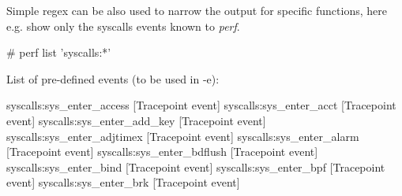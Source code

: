 Simple regex can be also used to narrow the output for specific
functions, here e.g. show only the syscalls events known to {\em perf}.

\starttyping
# perf list 'syscalls:*'

List of pre-defined events (to be used in -e):

  syscalls:sys_enter_access                          [Tracepoint event]
  syscalls:sys_enter_acct                            [Tracepoint event]
  syscalls:sys_enter_add_key                         [Tracepoint event]
  syscalls:sys_enter_adjtimex                        [Tracepoint event]
  syscalls:sys_enter_alarm                           [Tracepoint event]
  syscalls:sys_enter_bdflush                         [Tracepoint event]
  syscalls:sys_enter_bind                            [Tracepoint event]
  syscalls:sys_enter_bpf                             [Tracepoint event]
  syscalls:sys_enter_brk                             [Tracepoint event]
\stoptyping
